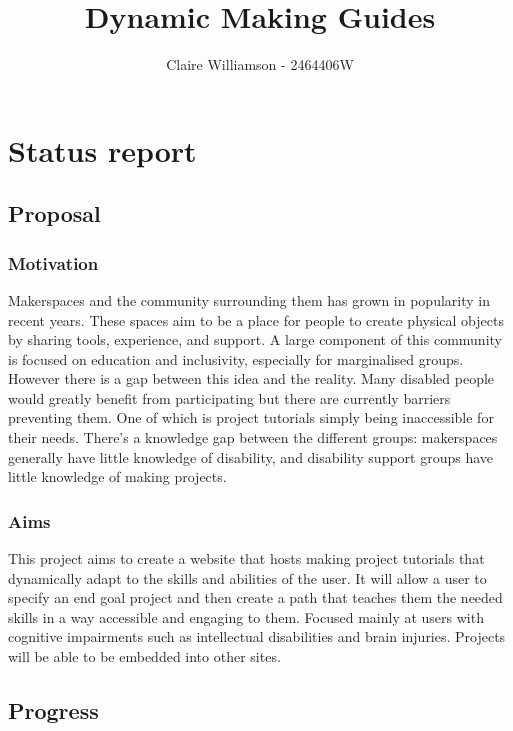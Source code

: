 \documentclass[11pt]{article}
\title{ Dynamic Making Guides }
\author{ Claire Williamson - 2464406W }
\begin{document}
\maketitle




\section{Status report}

\subsection{Proposal}\label{proposal}

\subsubsection{Motivation}\label{motivation}

Makerspaces and the community surrounding them has grown in popularity in recent years. These spaces aim to be a place for people to create physical objects by sharing tools, experience, and support. A large component of this community is focused on education and inclusivity, especially for marginalised groups. However there is a gap between this idea and the reality. Many disabled people would greatly benefit from participating but there are currently barriers preventing them. One of which is project tutorials simply being inaccessible for their needs. There's a knowledge gap between the different groups: makerspaces generally have little knowledge of disability, and disability support groups have little knowledge of making projects. 

\subsubsection{Aims}\label{aims}

This project aims to create a website that hosts making project tutorials that dynamically adapt to the skills and abilities of the user. It will allow a user to specify an end goal project and then create a path that teaches them the needed skills in a way accessible and engaging to them. Focused mainly at users with cognitive impairments such as intellectual disabilities and brain injuries. Projects will be able to be embedded into other sites. 

\subsection{Progress}\label{progress}
\end{document}
